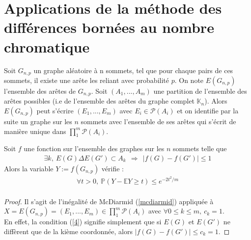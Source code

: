 \section{Applications de la méthode des différences bornées au nombre chromatique}
Soit $G_{n,p}$ un graphe aléatoire à n sommets, tel que pour chaque pairs de ces sommets, il existe une arête les reliant avec probabilité $p$.
On note $E(G_{n,p})$ l'ensemble des arêtes de $G_{n,p}$.
Soit $(A_1,...,A_m)$ une partition de l'ensemble des arêtes possibles (i.e de l'ensemble des arêtes du graphe complet $\mathbb{K}_n$).
Alors $E(G_{n,p})$ peut s'écrire $(E_1,...,E_m)$ avec $E_i \in \mathcal{P}(A_i)$ et on identifie par la suite un graphe sur les $n$ sommets avec l'ensemble de ses arêtes qui s'écrit de manière unique dans $\prod_{1}^{m} \mathcal{P}(A_i)$.

\begin{theorem}
\label{3.2}
Soit $f$ une fonction sur l'ensemble des graphes sur les $n$ sommets telle que
\begin{eqnarray}
\label{4}
\exists k,~ E(G)\Delta E(G') \subset A_k ~~\Rightarrow~~ |f(G)-f(G')|\leq 1 
\end{eqnarray}
Alors la variable $Y:=f(G_{n,p})$ vérifie :
\begin{eqnarray*}
\forall t>0,~\mathbb{P}(Y-\mathbb{E}Y \geq t) \leq e^{-2t^2/m} \\
\end{eqnarray*}

\end{theorem}

\begin{proof}
Il s'agit de l'inégalité de McDiarmid (\ref{mcdiarmid}) appliquée à $X=E(G_{n,p})=(E_1,...,E_m) \in \prod_{1}^{m}\mathcal{P}(A_i)$ avec  $\forall 0 \leq k \leq m,~ c_k=1$.\\
En effet, la condition (\ref{4}) signifie simplement que si $E(G)$ et $E(G')$ ne diffèrent que de la kième coordonnée, alors $|f(G)-f(G')| \leq c_k = 1$.
\end{proof}



